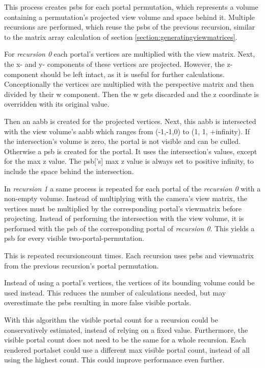 This process creates \glspl{psb} for each portal permutation, which represents a volume containing a permutation's projected view volume and space behind it. Multiple recursions are performed, which reuse the \glspl{psb} of the previous recursion, similar to the matrix array calculation of section \ref{section:generatingviewmatrices}.

For \textit{recursion 0} each portal's vertices are multiplied with the view matrix. Next, the x- and y- components of these vertices are projected. However, the z-component should be left intact, as it is useful for further calculations. Conceptionally the vertices are multiplied with the perspective matrix and then divided by their w component. Then the w gets discarded and the z coordinate is overridden with its original value.

Then an \gls{aabb} is created for the projected vertices. Next, this \gls{aabb} is intersected with the view volume's \gls{aabb} which ranges from (-1,-1,0) to (1, 1, +infinity). If the intersection's volume is zero, the portal is not visible and can be culled. Otherwise a \gls{psb} is created for the portal. It uses the intersection's values, except for the max z value. The \gls{psb}['s] max z value is always set to positive infinity, to include the space behind the intersection.

In \textit{recursion 1} a same process is repeated for each portal of the \textit{recursion 0} with a non-empty volume. Instead of multiplying with the camera's view matrix, the vertices must be multiplied by the corresponding portal's \gls{viewmatrix} before projecting. Instead of performing the intersection with the view volume, it is performed with the \gls{psb} of the corresponding portal of \textit{recursion 0}. This yields a \gls{psb} for every visible two-portal-permutation.

This is repeated \gls{recursioncount} times. Each recursion uses \glspl{psb} and \gls{viewmatrix} from the previous recursion's portal permutation.

Instead of using a portal's vertices, the vertices of its bounding volume could be used instead. This reduces the number of calculations needed, but may overestimate the \glspl{psb} resulting in more false visible portals.

With this algorithm the visible portal count for a recursion could be conservatively estimated, instead of relying on a fixed value. Furthermore, the visible portal count does not need to be the same for a whole recursion. Each rendered \gls{portalset} could use a different max visible portal count, instead of all using the highest count. This could improve performance even further.

